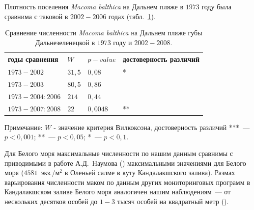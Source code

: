 Плотность поселения {\it Macoma balthica} на Дальнем пляже в $1973$ году была сравнима с таковой в $2002-2006$ годах (табл.~\ref{tab:DZ_N_1973_sravnenie}).
	\begin{table}[p]
	\caption{Сравнение численности {\it Macoma balthica} на Дальнем пляже губы Дальнезеленецкой в $1973$ году и $2002-2008$.}
	\label{tab:DZ_N_1973_sravnenie}
	\begin{tabularx}{\textwidth}{|*{4}{X|}} \hline
	годы сравнения & $W$ & $p-value$ & достоверность различий \\ 
	\hline
	$1973 - 2002$ & $31,5$ & $0,08$ & *\\
	\hline
	$1973 - 2003$ & $80,5$ & $0,86$ & \\
	\hline
	$1973 - 2004:2006$ &  $214$ & $0,44$ & \\
	\hline
	$1973 - 2007:2008$ & $22$ & $0,0048$ & ** \\
	\hline
	\end{tabularx}
	{\footnotesize Примечание: $W$ - значение критерия Вилкоксона, достоверность различий ***~--- $p<0,001$; **~--- $p<0,05$; *~--- $p<0,1$.}
	\end{table}


Для Белого моря максимальные численности по нашим данным сравнимы с приводимыми в работе А.Д.~Наумова (\cite{Naumov_2006}) максимальными значениями для Белого моря ($4581$~экз./м$^2$ в Оленьей салме в куту Кандалакшского залива). 
Размах варьирования численности маком по данным других мониторинговых программ в Кандалакшском заливе Белого моря аналогичен нашим наблюдениям~--- от нескольких десятков особей до $1-3$ тысяч особей на квадратный метр (\cite{Semenova_1974, Maximovich_et_al_1991, Varfolomeeva_Naumov_2013}). 



